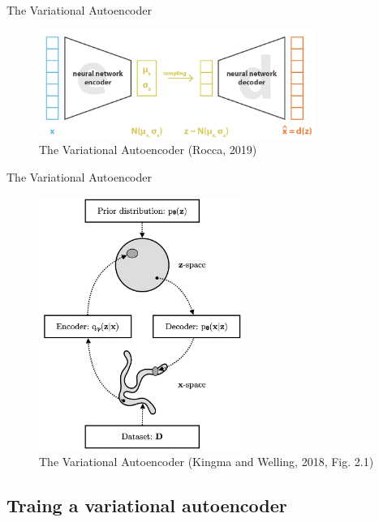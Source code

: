 \documentclass[10pt]{beamer}
\begin{document}
\begin{frame}{The Variational Autoencoder}

\begin{figure}[h]
\centering
\includegraphics[width=0.8\textwidth]{fig/Rocca_VAE2.png}
\caption{The Variational Autoencoder (Rocca, 2019)}
\end{figure}

\end{frame}


\begin{frame}{The Variational Autoencoder}

\begin{figure}[h]
\centering
\includegraphics[width=0.6\textwidth]{fig/Kingma_Welling_2018_Fig_2_1.png}
\caption{The Variational Autoencoder (Kingma and Welling, 2018, Fig. 2.1)}
\end{figure}
\end{frame}

\subsection{Traing a variational autoencoder}
\end{document}

